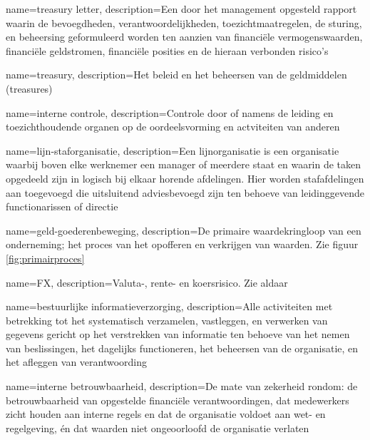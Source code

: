 
\makeglossaries

{
    name=treasury letter,
    description={Een door het management opgesteld rapport waarin de bevoegdheden, verantwoordelijkheden, toezichtmaatregelen, de sturing, en beheersing geformuleerd worden ten aanzien van financiële vermogenswaarden, financiële geldstromen, financiële posities en de hieraan verbonden risico’s}
}

{
    name=treasury,
    description={Het beleid en het beheersen van de geldmiddelen (treasures)}
}

{
    name=interne controle,
    description={Controle door of namens de leiding en toezichthoudende organen op de oordeelsvorming en actviteiten van anderen}
}

{
    name=lijn-staforganisatie,
    description={Een lijnorganisatie is een organisatie waarbij boven elke werknemer een manager of meerdere staat en waarin de taken opgedeeld zijn in logisch bij elkaar horende afdelingen. Hier worden stafafdelingen aan toegevoegd die uitsluitend adviesbevoegd zijn ten behoeve van leidinggevende functionarissen of directie}
}

{
    name=geld-goederenbeweging,
    description={De primaire waardekringloop van een onderneming; het proces van het opofferen en verkrijgen van waarden. Zie figuur \ref{fig:primairproces}}
}

{
    name=FX,
    description={Valuta-, rente- en koersrisico. Zie aldaar}
}

{
    name=bestuurlijke informatieverzorging,
    description={Alle activiteiten met betrekking tot het systematisch verzamelen, vastleggen, en verwerken van gegevens gericht op het verstrekken van informatie ten behoeve van het nemen van beslissingen, het dagelijks functioneren, het beheersen van de organisatie, en het afleggen van verantwoording}
}

{
    name=interne betrouwbaarheid,
    description={De mate van zekerheid rondom: de betrouwbaarheid van opgestelde financiële verantwoordingen, dat medewerkers zicht houden aan interne regels en dat de organisatie voldoet aan wet- en regelgeving, én dat waarden niet ongeoorloofd de organisatie verlaten}
}

